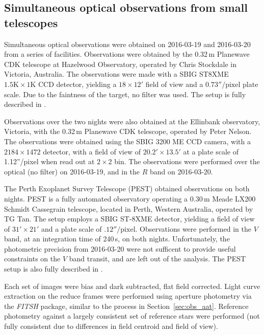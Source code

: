 \documentclass[iop,useAMES,usenatbig]{emulateapj}
\begin{document}
\subsection{Simultaneous optical observations from small telescopes}
\label{sec:simultaneous-optical}

Simultaneous optical observations were obtained on 2016-03-19 and 2016-03-20 from a series of facilities. Observations were obtained by the 0.32\,m Planewave CDK telescope at Hazelwood Observatory, operated by Chris Stockdale in Victoria, Australia. The observations were made with a SBIG ST8XME $1.5\mathrm{K}\times1 \mathrm{K}$ CCD detector, yielding a $18\times12'$ field of view and a $0.73''/\mathrm{pixel}$ plate scale. Due to the faintness of the target, no filter was used. The setup is fully described in \citet{2015arXiv150908953R}.

Observations over the two nights were also obtained at the Ellinbank observatory, Victoria, with the 0.32\,m Planewave CDK telescope, operated by Peter Nelson. The observations were obtained using the SBIG 3200 ME CCD camera, with a $2184\times1472$ detector, with a field of view of $20.2' \times 13.5'$ at a plate scale of 1.12''/pixel when read out at $2\times 2$ bin. The observations were performed over the optical (no filter) on 2016-03-19, and in the $R$ band on 2016-03-20. 

The Perth Exoplanet Survey Telescope (PEST) obtained observations on both nights. PEST is a fully automated observatory operating a 0.30\,m Meade LX200 Schmidt Cassegrain telescope, located in Perth, Western Australia, operated by TG Tan. The setup employs a SBIG ST-8XME detector, yielding a field of view of $31'\times 21'$ and a plate scale of $.12''/\mathrm{pixel}$. Observations were performed in the $V$ band, at an integration time of 240\,s, on both nights. Unfortunately, the photometric precision from 2016-03-20 were not sufficent to provide useful constraints on the $V$ band transit, and are left out of the analysis. The PEST setup is also fully described in \citet{2015arXiv150908953R}.

Each set of images were bias and dark subtracted, flat field corrected. Light curve extraction on the reduce frames were performed using aperture photometry via the \emph{FITSH} package, similar to the process in Section~\ref{sec:obs_aat}. Reference photometry against a largely consistent set of reference stars were performed (not fully consistent due to differences in field centroid and field of view). 
\end{document}
